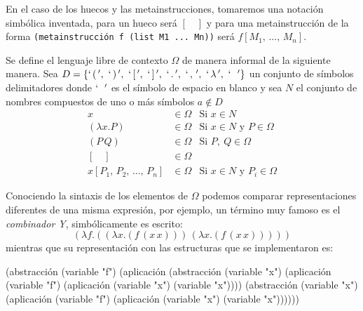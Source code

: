 \documentclass[10pt,oneside,openany,letterpaper]{book}
\begin{document}
En el caso de los huecos y las metainstrucciones, tomaremos una notación simbólica inventada, para un hueco será \( [\quad ] \) y para una metainstrucción de la forma {\tt{}(\protect{}metainstrucción\ f\ (list\ M1\ ...\ Mn))} será \( f[M_{1},\, ...,\, M_{n}] \).

Se define el lenguaje libre de contexto \( Ω \) de manera informal de la siguiente manera. Sea \( D = \left\{ `\, (\, ',\ `\, )\, ',\ `\, [\, ',\ `\, ]\, ',\ `\, .\, ',\ `\, ,\, ',\ `\, \lambda\, ',\ `\, \, \, \, ' \right\} \) un conjunto de símbolos delimitadores donde \( `\, \, \, \, ' \) es el símbolo de espacio en blanco y sea \( N \) el conjunto de nombres compuestos de uno o más símbolos \( a \not\in D \)
\begin{align*}
  x &\in Ω &\text{Si } x \in N \\
  (λx.P) &\in Ω &\text{Si } x \in N \text{ y } P \in Ω \\
  (P\, Q) &\in Ω &\text{Si } P,\ Q \in Ω \\
  [\quad ] &\in Ω \\
  x[P_{1},\, P_{2},\, ...,\, P_{n}] &\in Ω &\text{Si } x \in N \text{ y } P_{i} \in Ω
\end{align*}

Conociendo la sintaxis de los elementos de \( Ω \) podemos comparar representaciones diferentes de una misma expresión, por ejemplo, un término muy famoso es el \emph{combinador Y}, simbólicamente es escrito:
\[ (λf.((λx.(f\, (x\, x)))\, (λx.(f\, (x\, x))))) \]
mientras que su representación con las estructuras que se implementaron es:

\nwenddocs{}\endmoddef
(abstracción (variable "f")
             (aplicación (abstracción (variable "x")
                                      (aplicación (variable "f")
                                                  (aplicación (variable "x")
                                                              (variable "x"))))
                         (abstracción (variable "x")
                                      (aplicación (variable "f")
                                                  (aplicación (variable "x")
                                                              (variable "x"))))))
\nwendcode{}\nwdocspar
\end{document}
